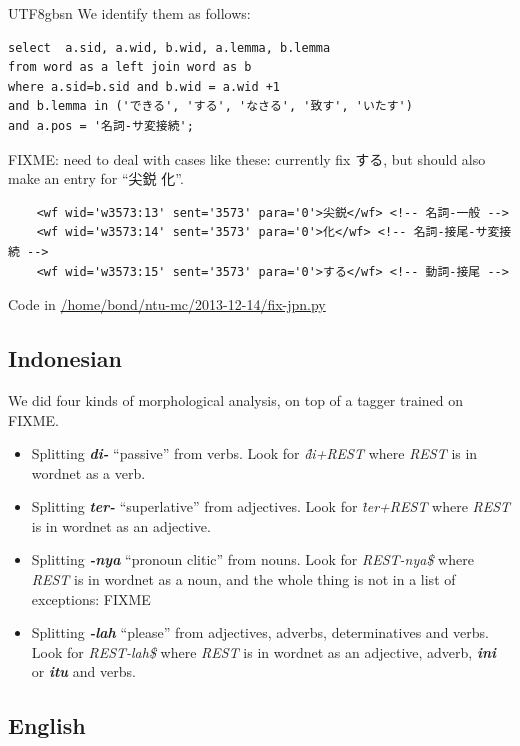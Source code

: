 \documentclass[12pt]{book} %
\newcommand{\lex}[1]{\textbf{\textit{#1}}}
\begin{document}
\begin{CJK}{UTF8}{gbsn}
We identify them as follows:
\begin{verbatim}
select  a.sid, a.wid, b.wid, a.lemma, b.lemma 
from word as a left join word as b   
where a.sid=b.sid and b.wid = a.wid +1
and b.lemma in ('できる', 'する', 'なさる', '致す', 'いたす') 
and a.pos = '名詞-サ変接続';
\end{verbatim}

FIXME: need to deal with cases like these: currently fix する,  but should also make an entry for ``尖鋭 化''.

\begin{verbatim}
    <wf wid='w3573:13' sent='3573' para='0'>尖鋭</wf> <!-- 名詞-一般 -->
    <wf wid='w3573:14' sent='3573' para='0'>化</wf> <!-- 名詞-接尾-サ変接続 -->
    <wf wid='w3573:15' sent='3573' para='0'>する</wf> <!-- 動詞-接尾 -->
\end{verbatim}

Code in \url{/home/bond/ntu-mc/2013-12-14/fix-jpn.py}

\subsection{Indonesian}

We did four kinds of morphological analysis, on top of a tagger trained on FIXME.

\begin{itemize}
\item Splitting \lex{di-} ``passive'' from verbs.  Look for
  \textit{\^di+REST} where \textit{REST} is in wordnet as a verb.
\item Splitting \lex{ter-} ``superlative'' from adjectives.  Look for
  \textit{\^ter+REST} where \textit{REST} is in wordnet as an adjective.
\item Splitting \lex{-nya} ``pronoun clitic'' from nouns.  Look for
  \textit{REST-nya\$} where \textit{REST} is in wordnet as a noun, and the whole thing is not in a list of exceptions: FIXME
\item Splitting \lex{-lah} ``please'' from adjectives, adverbs,
  determinatives and verbs.  Look for \textit{REST-lah\$} where
  \textit{REST} is in wordnet as an adjective, adverb, \lex{ini} or
  \lex{itu} and verbs.
\end{itemize}

\subsection{English}


\end{CJK}
\end{document}
